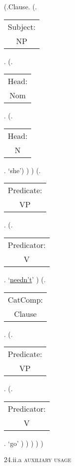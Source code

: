 \documentclass[12pt,letterpaper]{article}
\begin{document}
\begin{figure}
	\begin{center}
		\begin{parsetree}
			(.Clause.
			(.\begin{tabular}{c}Subject:\\NP\end{tabular}.  
			(.\begin{tabular}{c}Head:\\Nom\end{tabular}.
			(.\begin{tabular}{c}Head:\\N\end{tabular}. `she')
			)
			)
			(.\begin{tabular}{c}Predicate:\\VP\end{tabular}.
			(.\begin{tabular}{c}Predicator:\\V\end{tabular}.    `\underline{needn't}' )
			(.\begin{tabular}{c}CatComp:\\Clause\end{tabular}. 
			(.\begin{tabular}{c}Predicate:\\VP\end{tabular}.
			(.\begin{tabular}{c}Predicator:\\V\end{tabular}.    `go' )
			)
			)
			)
			)


\end{parsetree}
\hfill \break \hfill \break
24.ii.a \textsc{auxiliary usage}
\end{center}
\end{figure}
\end{document}
